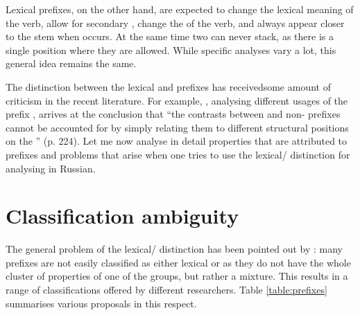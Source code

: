 Lexical prefixes, on the other hand, are expected to change the lexical meaning of the verb, allow for secondary , change the  of the verb, and always appear closer to the stem when  occurs. At the same time two  can never stack, as there is a single position where they are allowed. While specific analyses vary a lot, this general idea remains the same. 

The distinction between the lexical and  prefixes has received\linebreak some amount of criticism in the recent literature. For example, \citet{Braginsky:08}, analysing different usages of the prefix , arrives at the conclusion that ``the contrasts
between  and non- prefixes  cannot be account\-ed for by
simply relating them to different structural positions on the '' (p. 224). Let me now analyse in detail properties that are attributed to  prefixes and problems that arise when one tries to use the lexical\slash{} distinction for analysing  in Russian.


\section{Classification ambiguity}\label{section:classification}
The general problem of the lexical/ distinction has been pointed out by \citet[32]{Kagan:book}: many prefixes are not easily classified as either lexical or  as they do not have the whole cluster of properties of one of the groups, but rather a mixture. This results in a range of classifications offered by different researchers. Table \ref{table:prefixes} summarises various proposals in this respect.


